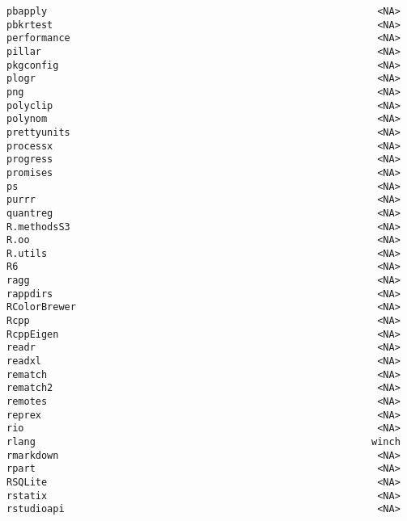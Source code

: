 \documentclass[
  letterpaper,
  DIV=11,
  numbers=noendperiod]{scrreprt}
\begin{document}
\begin{verbatim}
pbapply                                                         <NA>
pbkrtest                                                        <NA>
performance                                                     <NA>
pillar                                                          <NA>
pkgconfig                                                       <NA>
plogr                                                           <NA>
png                                                             <NA>
polyclip                                                        <NA>
polynom                                                         <NA>
prettyunits                                                     <NA>
processx                                                        <NA>
progress                                                        <NA>
promises                                                        <NA>
ps                                                              <NA>
purrr                                                           <NA>
quantreg                                                        <NA>
R.methodsS3                                                     <NA>
R.oo                                                            <NA>
R.utils                                                         <NA>
R6                                                              <NA>
ragg                                                            <NA>
rappdirs                                                        <NA>
RColorBrewer                                                    <NA>
Rcpp                                                            <NA>
RcppEigen                                                       <NA>
readr                                                           <NA>
readxl                                                          <NA>
rematch                                                         <NA>
rematch2                                                        <NA>
remotes                                                         <NA>
reprex                                                          <NA>
rio                                                             <NA>
rlang                                                          winch
rmarkdown                                                       <NA>
rpart                                                           <NA>
RSQLite                                                         <NA>
rstatix                                                         <NA>
rstudioapi                                                      <NA>

\end{verbatim}
\end{document}
